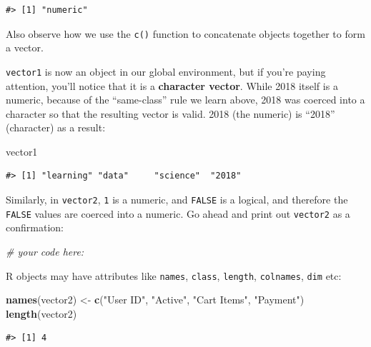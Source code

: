 \documentclass[]{article}
\newenvironment{Shaded}{\begin{snugshade}}{\end{snugshade}}
\newcommand{\CommentTok}[1]{\textcolor[rgb]{0.56,0.35,0.01}{\textit{#1}}}
\newcommand{\KeywordTok}[1]{\textcolor[rgb]{0.13,0.29,0.53}{\textbf{#1}}}
\newcommand{\NormalTok}[1]{#1}
\newcommand{\StringTok}[1]{\textcolor[rgb]{0.31,0.60,0.02}{#1}}
\begin{document}
\begin{verbatim}
#> [1] "numeric"
\end{verbatim}

Also observe how we use the \texttt{c()} function to concatenate objects
together to form a vector.

\texttt{vector1} is now an object in our global environment, but if
you're paying attention, you'll notice that it is a \textbf{character
vector}. While 2018 itself is a numeric, because of the ``same-class''
rule we learn above, 2018 was coerced into a character so that the
resulting vector is valid. 2018 (the numeric) is ``2018'' (character) as
a result:

\begin{Shaded}
\begin{Highlighting}[]
\NormalTok{vector1}
\end{Highlighting}
\end{Shaded}

\begin{verbatim}
#> [1] "learning" "data"     "science"  "2018"
\end{verbatim}

Similarly, in \texttt{vector2}, \texttt{1} is a numeric, and
\texttt{FALSE} is a logical, and therefore the \texttt{FALSE} values are
coerced into a numeric. Go ahead and print out \texttt{vector2} as a
confirmation:

\begin{Shaded}
\begin{Highlighting}[]
\CommentTok{# your code here:}
\end{Highlighting}
\end{Shaded}

R objects may have attributes like \texttt{names}, \texttt{class},
\texttt{length}, \texttt{colnames}, \texttt{dim} etc:

\begin{Shaded}
\begin{Highlighting}[]
\KeywordTok{names}\NormalTok{(vector2) <-}\StringTok{ }\KeywordTok{c}\NormalTok{(}\StringTok{"User ID"}\NormalTok{, }\StringTok{"Active"}\NormalTok{, }\StringTok{"Cart Items"}\NormalTok{, }\StringTok{"Payment"}\NormalTok{)}
\KeywordTok{length}\NormalTok{(vector2)}
\end{Highlighting}
\end{Shaded}

\begin{verbatim}
#> [1] 4
\end{verbatim}
\end{document}

